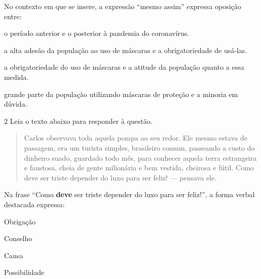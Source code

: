 
No contexto em que se insere, a expressão ``mesmo assim'' expressa oposição entre:


\begin{escolha}

  \item o período anterior e o posterior à pandemia do coronavírus.

  \item a alta adesão da população ao uso de máscaras e a obrigatoriedade de usá-las.

  \item a obrigatoriedade do uso de máscaras e a atitude da população quanto a essa medida.

  \item grande parte da população utilizando máscaras de proteção e a minoria em dúvida.

\end{escolha}


\num{2} Leia o texto abaixo para responder à questão. 

\begin{quote}

Carlos observava toda aquela pompa ao seu redor. Ele mesmo estava de passagem,
era um turista simples, brasileiro comum, passeando a custo do dinheiro suado, 
guardado todo mês, para conhecer aquela terra estrangeira e faustosa, cheia de 
gente milionária e bem vestida, cheirosa e fútil. Como deve ser triste depender
do luxo para ser feliz! --- pensava ele.     

\end{quote}


Na frase ``Como \textbf{deve} ser triste depender do luxo para ser feliz!'', 
a forma verbal destacada expressa:



\begin{escolha}
  
  \item Obrigação
  
  \item Conselho
  
  \item Causa
  
  \item Possibilidade

\end{escolha}


